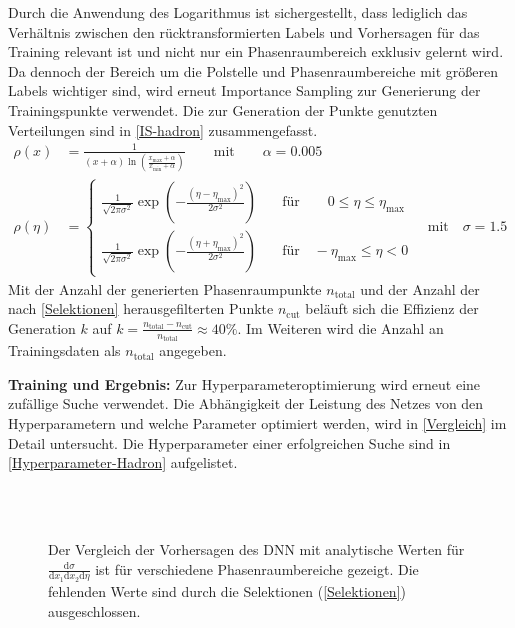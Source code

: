 Durch die Anwendung des Logarithmus ist sichergestellt, dass lediglich das Verhältnis zwischen den rücktransformierten Labels und Vorhersagen für das Training relevant ist und nicht nur ein Phasenraumbereich exklusiv gelernt wird. Da dennoch der Bereich um die Polstelle und Phasenraumbereiche mit größeren Labels wichtiger sind, wird erneut Importance Sampling zur Generierung der Trainingspunkte verwendet. Die zur Generation der Punkte genutzten Verteilungen sind in \textsf{\autoref{IS-hadron}} zusammengefasst.  
\begin{equation}
\begin{aligned}
\rho(x) &= \frac{1}{(x + \alpha)\ln(\frac{x_{\text{max}} + \alpha}{x_{\text{min}}+ \alpha})} \qquad \text{mit} \qquad \alpha = 0.005 \\
\rho(\eta) &= \begin{cases}
\frac{1}{\sqrt{2\pi \sigma^2}} \exp(-\frac{(\eta - \eta_{\text{max}})^2}{2\sigma^2}) \quad & \text{für} \qquad 0 \leq \eta \leq \eta_{\text{max}}\\
\frac{1}{\sqrt{2\pi \sigma^2}} \exp(-\frac{(\eta + \eta_{\text{max}})^2}{2\sigma^2}) \quad & \text{für} \quad -\eta_{\text{max}} \leq \eta < 0
\end{cases} \quad \text{mit} \quad \sigma = 1.5
\end{aligned}
\label{IS-hadron}
\end{equation}
Mit der Anzahl der generierten Phasenraumpunkte $n_{\text{total}}$ und der Anzahl der nach \textsf{\autoref{Selektionen}} herausgefilterten Punkte $n_{\text{cut}}$ beläuft sich die Effizienz der Generation $k$ auf $k = \frac{n_{\text{total}} - n_{\text{cut}}}{n_{\text{total}}} \approx 40 \%$. Im Weiteren wird die Anzahl an Trainingsdaten als $n_{\text{total}}$ angegeben.

\textbf{Training und Ergebnis:} Zur Hyperparameteroptimierung wird erneut eine zufällige Suche verwendet. Die Abhängigkeit der Leistung des Netzes von den Hyperparametern und welche Parameter optimiert werden, wird in \textsf{\autoref{Vergleich}} im Detail untersucht. Die Hyperparameter einer erfolgreichen Suche sind in \textsf{\autoref{Hyperparameter-Hadron}} aufgelistet. 
\begin{figure}[tbp] %
	\centering
	\captionsetup{justification=justified}
	 \\
	 \\
	\caption{Der Vergleich der Vorhersagen des DNN mit analytische Werten für $\frac{\text{d} \sigma}{\text{d}x_1\text{d}x_2\text{d}\eta}$ ist für verschiedene Phasenraumbereiche gezeigt. Die fehlenden Werte sind durch die Selektionen (\textsf{\autoref{Selektionen}}) ausgeschlossen.}
	\label{Schnitte Hadron}
\end{figure}

